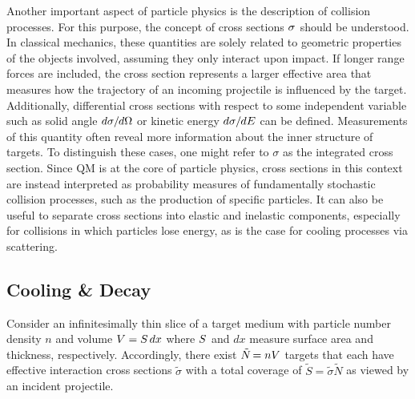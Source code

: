 \begin{spacing}{0.985}
	Another important aspect of particle physics is the description of collision processes. For this purpose, the concept of cross
	sections $\sigma \kern+0.5pt$ should be understood. In classical mechanics, these quantities are solely related to geometric
	properties of the objects involved, assuming they only interact upon impact. If longer range forces are included, the
	cross section represents a larger effective area that measures how the trajectory of an incoming projectile is influenced by
	the target. Additionally, differential cross sections with respect to some independent variable such as solid angle
	$d\sigma \kern-0.3pt / \kern-0.6pt d\Omega$ or kinetic energy $d\sigma \kern-0.3pt / \kern-0.6pt dE$ can be defined.
	Measurements of this quantity often reveal more information about the inner structure of targets. To distinguish these cases,
	one might refer to $\sigma$ as the integrated cross section. Since QM is at the core of particle physics, cross sections in this
	context are instead interpreted as probability measures of fundamentally stochastic collision processes, such as the production
	of specific particles. It can also be useful to separate cross sections into elastic and inelastic components, especially for
	collisions in which particles lose energy, as is the case for cooling processes via scattering.



	\subsection{Cooling \& Decay}
	\label{sub:cooling}

	Consider an infinitesimally thin slice of a target medium with particle number density $n$ and volume $V \kern-0.1pt = S \kern+1.5pt dx$
	where $S \kern+0.5pt$ and $dx$ measure surface area and thickness, respectively. Accordingly, there exist $\tilde{N} \kern-1.2pt = nV$
	targets that each have effective interaction cross sections $\tilde{\sigma}$ with a total coverage of $\tilde{S} = \tilde{\sigma} \tilde{N}$
	as viewed by an incident projectile.
	\enlargethispage{\baselineskip}\newpage
\end{spacing}


